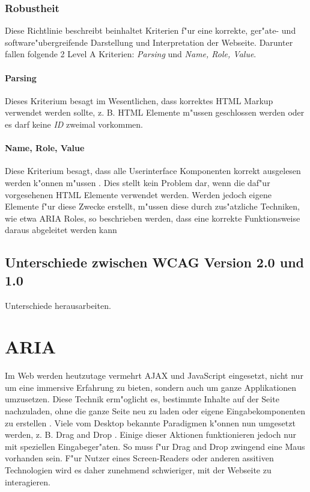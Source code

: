 \documentclass[a4paper,bibtotoc,oneside]{scrbook}
\begin{document}
\subsection{Robustheit}
Diese Richtlinie beschreibt beinhaltet Kriterien f"ur eine korrekte, ger"ate- und software"ubergreifende Darstellung und Interpretation der Webseite. Darunter fallen folgende 2 Level A Kriterien: \emph{Parsing} und \emph{Name, Role, Value}. \cite[Abschnitt 4.1]{wcag2}

\subsubsection{Parsing}
Dieses Kriterium besagt im Wesentlichen, dass korrektes HTML Markup verwendet werden sollte, z. B. HTML Elemente m"ussen geschlossen werden oder es darf keine \emph{ID} zweimal vorkommen. \cite[Abschnitt 4.1.1]{wcag2}

\subsubsection{Name, Role, Value}
Diese Kriterium besagt, dass alle Userinterface Komponenten korrekt ausgelesen werden k"onnen m"ussen \cite[Abschnitt 4.1.2]{wcag2}. Dies stellt kein Problem dar, wenn die daf"ur vorgesehenen HTML Elemente verwendet werden. Werden jedoch eigene Elemente f"ur diese Zwecke erstellt, m"ussen diese durch zus"atzliche Techniken, wie etwa ARIA Roles, so beschrieben werden, dass eine korrekte Funktionsweise daraus abgeleitet werden kann \cite[Abschnitt Intent of this Success Criterion]{understand_412}

\section{Unterschiede zwischen WCAG Version 2.0 und 1.0}
Unterschiede herausarbeiten.


\chapter{ARIA}
Im Web werden heutzutage vermehrt AJAX und JavaScript eingesetzt, nicht nur um eine immersive Erfahrung zu bieten, sondern auch um ganze Applikationen umzusetzen. Diese Technik erm"oglicht es, bestimmte Inhalte auf der Seite nachzuladen, ohne die ganze Seite neu zu laden oder eigene Eingabekomponenten zu erstellen \cite[S.26]{mod_software}. Viele vom Desktop bekannte Paradigmen k"onnen nun umgesetzt werden, z. B. \glqq Drag and Drop \grqq. Einige dieser Aktionen funktionieren jedoch nur mit speziellen Eingabeger"aten. So muss f"ur Drag and Drop zwingend eine Maus vorhanden sein. F"ur Nutzer eines Screen-Readers oder anderen assitiven Technologien wird es daher zunehmend schwieriger, mit der Webseite zu interagieren. \cite{aria_intro}
\end{document}
